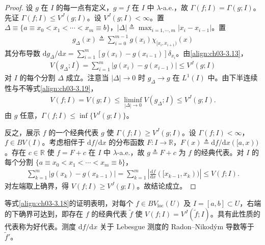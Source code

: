\documentclass[../../main.tex]{subfiles}%
\begin{document}
\begin{proof}
设 $g$ 在 $I$ 的每一点有定义，$g=f$ 在 $I$ 中 $\lambda$-a.e.，故 $\Gamma(f;I)=\Gamma(g;I)$。先证 $\Gamma(f;I)\leqslant V^J(g;I)$。设 $V^J(g;I)<\infty$。置 $\Delta\equiv\{a\equiv x_0<x_1<\cdots<x_m\equiv b\}$，$|\Delta|\triangleq \max_{i=1,\cdots ,m}|x_i-x_{i-1}|$。置
\begin{align*}
g_\Delta(x)\triangleq \sum_{i=0}^{m-1}g(x_i)\chi_{[x_i,x_{i+1})}(x)
\end{align*}
其分布导数 $\mathrm{d}g_\Delta/\mathrm{d}x=\sum_{i=1}^m[g(x_i)-g(x_{i-1})]\delta_{x_i}$。由\eqref{align:ch03-3.13}，
\begin{align}
V(g_\Delta;I)=\sum_{i=1}^m|g(x_i)-g(x_{i-1})|\leqslant V^J(g;I)\label{align:ch03-3.19}
\end{align}
对 $I$ 的每个分割 $\Delta$ 成立。注意当 $|\Delta|\to0$ 时 $g_\Delta\to g$ 在 $L^1(I)$ 中。由下半连续性与不等式\eqref{align:ch03-3.19}，
\begin{align*}
V(f;I)=V(g;I)\leqslant\liminf_{|\Delta|\to0}V(g_\Delta;I)\leqslant V^J(g;I).
\end{align*}
由 $g$ 任意，$\Gamma(f;I)\leqslant\inf\{V^J(g;I)\}$。

反之，展示 $f$ 的一个经典代表 $g$ 使 $\Gamma(f;I)\geqslant V^J(g;I)$。设 $\Gamma(f;I)<\infty$，$f\in BV(I)$。考虑相伴于 $\mathrm{d}f/\mathrm{d}x$ 的分布函数 $F:I\to\mathbb{R}$，$F(x)\triangleq \mathrm{d}f/\mathrm{d}x([a,x))$。存在 $c\in\mathbb{R}$ 使 $f=F+c$ 在 $I$ 中 $\lambda$-a.e.，故 $g\triangleq F+c$ 为 $f$ 的经典代表。对 $I$ 的每个分割 $\{a\equiv x_0<x_1<\cdots<x_m\equiv b\}$，
\begin{align*}
\sum_{k=1}^m|g(x_k)-g(x_{k-1})|
=\sum_{k=1}^m\left|\frac{\mathrm{d}f}{\mathrm{d}x}([x_{k-1},x_k))\right|
\leqslant V(f;I).
\end{align*}
对左端取上确界，得 $V(f;I)\geqslant V^J(g;I)$。故结论成立。
\end{proof}

\begin{remark}\label{remark:ch03-好代表}
等式\eqref{align:ch03-3.18}的证明表明，对每个 $f\in BV_{\mathrm{loc}}(U)$ 及 $I=[a,b]\subset U$，右端的下确界可达到，即存在 $f$ 的经典代表 $\widetilde f$ 使 $V(f;I)=V^J(\widetilde f;I)$。具有此性质的代表称为好代表。测度 $\mathrm{d}f/\mathrm{d}x$ 关于 Lebesgue 测度的 Radon--Nikod\'ym 导数等于 $\widetilde f'$。
\end{remark}
\end{document}
